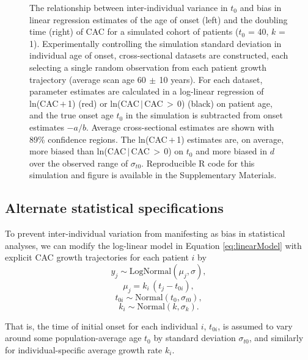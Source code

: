 \documentclass[aps,pre,twocolumn,twoside,tightenlines,groupedaddress,amsmath,amssymb,nobibnotes,final,showkeys,letterpaper]{revtex4-2}
\begin{document}
\begin{figure*}[t]
  \centering
  
  \caption{The relationship between inter-individual variance in $t_0$ and bias in linear regression estimates of the age of onset (left) and the doubling time (right) of CAC for a simulated cohort of \biasNumPatients{} patients ($t_0$ = 40, $k$ = 1). Experimentally controlling the simulation standard deviation in individual age of onset, \biasNumSamples{} cross-sectional datasets are constructed, each selecting a single random observation from each patient growth trajectory (average scan age 60$\,\pm\,$10 years). For each dataset, parameter estimates are calculated in a log-linear regression of ln(CAC\,$+$\,1) (red) or ln(CAC\,$|$\,CAC\,$>$\,0) (black) on patient age, and the true onset age $t_0$ in the simulation is subtracted from onset estimates $-a/b$. Average cross-sectional estimates are shown with 89\% confidence regions. The ln(CAC\,$+$\,1) estimates are, on average, \biasDiffOnset{} more biased than ln(CAC\,$|$\,CAC\,$>$\,0) on $t_0$ and \biasDiffDoubling{} more biased in $d$ over the observed range of $\sigma_{t0}$. Reproducible R code for this simulation and figure is available in the Supplementary Materials.}
  \label{fig:varianceBias}
\end{figure*}

\subsection*{Alternate statistical specifications}

To prevent inter-individual variation from manifesting as bias in statistical analyses, we can modify the log-linear model in Equation \ref{eq:linearModel} with explicit CAC growth trajectories for each patient $i$ by
$$
  y_j \sim \mathrm{LogNormal}(\mu_j, \sigma),
$$
\begin{equation}
  \label{eq:multiLinearModel}
  \mu_j = k_i\,(t_j - t_{0i}),
\end{equation}
$$
  t_{0i} \sim \mathrm{Normal}(t_0, \sigma_{t0}),
$$
$$
  k_i \sim \mathrm{Normal}(k, \sigma_{k}).
$$

That is, the time of initial onset for each individual $i$, $t_{0i}$, is assumed to vary around some population-average age $t_0$ by standard deviation $\sigma_{t0}$, and similarly for individual-specific average growth rate $k_i$.
\end{document}
